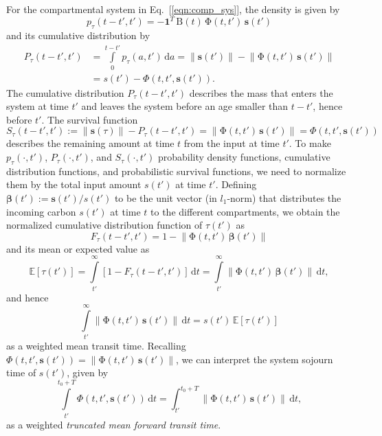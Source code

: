 \documentclass[9pt,twoside,lineno]{pnas-new_SI}
\newcommand{\intl}{\int\limits}
\newcommand{\dd}[1]{\,\mathrm{d}#1}
\renewcommand{\vec}[1]{\mathbf{#1}}
\newcommand{\tens}[1]{\mathrm{#1}}
\newcommand{\itPhi}{\mathit{\Phi}}
\newcommand{\noEqref}[1]{[\ref{#1}]}
\newcommand{\vnorm}[1]{\left\|#1\right\|}
\begin{document}
For the compartmental system in Eq.~\noEqref{eqn:comp_sys}, the density is given by
\begin{equation}
    p_\tau(t-t', t') = -\vec{1}^T\,\tens{B}(t)\,\tens{\Phi}(t, t')\,\vec{s}(t')
\end{equation}
and its cumulative distribution by
\begin{equation}
    \begin{aligned}
        P_\tau(t-t',t') &= \intl_0^{t-t'} p_\tau(a, t')\dd{a} = \vnorm{\vec{s}(t')} - \vnorm{\tens{\Phi}(t,t')\,\vec{s}(t')} \\
        &= s(t') - \itPhi(t,t',\vec{s}(t')).
    \end{aligned}
\end{equation}
The cumulative distribution $P_\tau(t-t',t')$ describes the mass that enters the system at time $t'$ and leaves the system before an age smaller than $t-t'$, hence before $t'$.
The survival function
\begin{equation}
    S_\tau(t-t',t'):=\vnorm{\vec{s}(\tau)} - P_\tau(t-t',t') = \vnorm{\tens{\Phi}(t,t')\,\vec{s}(t')} = \itPhi(t,t',\vec{s}(t'))
\end{equation}
describes the remaining amount at time $t$ from the input at time $t'$.
To make $p_\tau(\cdot,t')$, $P_\tau(\cdot,t')$, and $S_\tau(\cdot,t')$ probability density functions, cumulative distribution functions, and probabilistic survival functions, we need to normalize them by the total input amount $s(t')$ at time $t'$.
Defining $\vec{\beta}(t'):=\vec{s}(t')/s(t')$ to be the unit vector (in $l_1$-norm) that distributes the incoming carbon $s(t')$ at time $t$ to the different compartments, we obtain the normalized cumulative distribution function of $\tau(t')$ as
\begin{equation}
    F_\tau(t-t',t') = 1 - \vnorm{\tens{\Phi}(t,t')\,\vec{\beta}(t')}
\end{equation}
and its mean or expected value as
\begin{equation}
    \mathbb{E}\left[\tau(t')\right] = \intl_{t'}^\infty \left[1-F_\tau(t-t',t')\right]\dd{t} = \intl_{t'}^\infty \vnorm{\tens{\Phi}(t,t')\,\vec{\beta}(t')}\dd{t},
\end{equation}
and hence
\begin{equation}
    \intl_{t'}^\infty \vnorm{\tens{\Phi}(t,t')\,\vec{s}(t')}\dd{t} = s(t')\,\mathbb{E}\left[\tau(t')\right]
\end{equation}
as a weighted mean transit time.
Recalling $\itPhi(t,t',\vec{s}(t'))=\vnorm{\tens{\Phi}(t,t')\,\vec{s}(t')}$, we can interpret the system sojourn time of
$s(t')$, given by
\begin{equation}
    \intl_{t'}^{t_0+T} \itPhi(t,t',\vec{s}(t'))\dd{t} = \int_{t'}^{t_0+T} \vnorm{\tens{\Phi}(t,t')\,\vec{s}(t')}\dd{t},
\end{equation}
as a weighted \emph{truncated mean forward transit time}.
\end{document}
